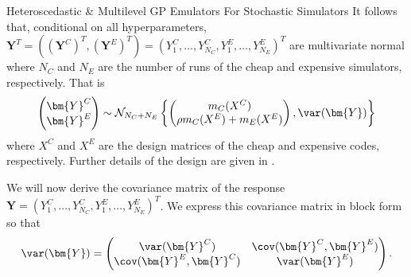 \begin{chapter}{Heteroscedastic \& Multilevel GP Emulators For Stochastic Simulators\label{Ch:Hetsml}}
It follows that, conditional on all hyperparameters,\newline $\bm{Y}^T = \left( (\bm{Y}^C)^T, (\bm{Y}^E)^T \right)= (Y^C_1, \ldots, Y^C_{N_C}, Y^E_1, \ldots, Y^E_{N_E})^T$ are multivariate normal where $N_C$ and $N_E$ are the number of runs of the cheap and expensive simulators, respectively. That is
\begin{equation*}
\begin{pmatrix} \bm{Y}^C \\ \bm{Y}^E \end{pmatrix} \sim \mathcal{N}_{N_C + N_E} \left\{ \begin{pmatrix} m_C(X^C) \\ \rho m_C(X^E) + m_E(X^E) \end{pmatrix}, \var(\bm{Y}) \right\}
\end{equation*}
where $X^C$ and $X^E$ are the design matrices of the cheap and expensive codes, respectively. Further details of the design are given in .

We will now derive the covariance matrix of the response $\bm{Y} = (Y^C_{1}, \ldots, Y^C_{N_C}, Y^E_{1}, \ldots, Y^E_{N_E} )^T$. We express this covariance matrix in block form so that
\begin{equation}
\var(\bm{Y}) = \begin{pmatrix}
\var(\bm{Y}^C) & \cov(\bm{Y}^C, \bm{Y}^E) \\
\cov(\bm{Y}^E, \bm{Y}^C) & \var(\bm{Y}^E)
\end{pmatrix}.\nonumber
\end{equation}


\end{chapter}
